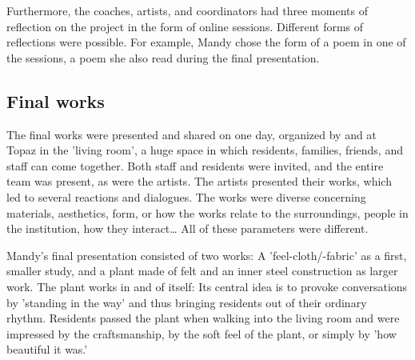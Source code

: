 \documentclass[authordate, empirical]{jote-new-article}
\begin{document}
	Furthermore, the coaches, artists, and coordinators had three moments of reflection on the project in the form of online sessions. Different forms of reflections were possible. For example, Mandy chose the form of a poem in one of the sessions, a poem she also read during the final presentation.







	\subsection{Final works}







	The final works were presented and shared on one day, organized by and at Topaz in the 'living room', a huge space in which residents, families, friends, and staff can come together. Both staff and residents were invited, and the entire team was present, as were the artists. The artists presented their works, which led to several reactions and dialogues. The works were diverse concerning materials, aesthetics, form, or how the works relate to the surroundings, people in the institution, how they interact… All of these parameters were different.







	Mandy's final presentation consisted of two works: A 'feel-cloth/-fabric' as a first, smaller study, and a plant made of felt and an inner steel construction as larger work. The plant works in and of itself: Its central idea is to provoke conversations by 'standing in the way' and thus bringing residents out of their ordinary rhythm. Residents passed the plant when walking into the living room and were impressed by the craftsmanship, by the soft feel of the plant, or simply by 'how beautiful it was.'
\end{document}
